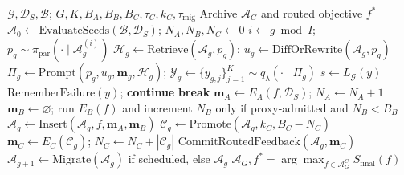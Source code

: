 \begin{algorithm}[t]
\caption{CoEvoP\&R objective evolution}
\label{alg:objective-evolution}
\scriptsize
\begin{algorithmic}[1]
\REQUIRE $\mathcal{G},\mathcal{D}_S,\mathcal{B}$;
$G,K,B_A,B_B,B_C,\tau_C,k_C,\tau_{\mathrm{mig}}$
\ENSURE Archive $\mathcal{A}_G$ and routed objective $f^*$
\STATE $\mathcal{A}_0\leftarrow\mathrm{EvaluateSeeds}(\mathcal{B},\mathcal{D}_S)$;
$N_A,N_B,N_C\leftarrow0$
  \STATE $i\leftarrow g\bmod I$;
  $p_g\sim\pi_{\mathrm{par}}(\cdot\mid\mathcal{A}_g^{(i)})$
  \STATE $\mathcal{H}_g\leftarrow\mathrm{Retrieve}(\mathcal{A}_g,p_g)$;
  $u_g\leftarrow\mathrm{DiffOrRewrite}(\mathcal{A}_g,p_g)$
  \STATE $\Pi_g\leftarrow\mathrm{Prompt}(p_g,u_g,\mathbf{m}_g,\mathcal{H}_g)$;
  $\mathcal{Y}_g\leftarrow\{y_{g,j}\}_{j=1}^{K}\sim q_\lambda(\cdot\mid\Pi_g)$
    \STATE $s\leftarrow L_{\mathcal{G}}(y)$
      \STATE $\mathrm{RememberFailure}(y)$; \textbf{continue}
    \ENDIF
       \STATE \textbf{break} \ENDIF
      \STATE $\mathbf{m}_A\leftarrow E_A(f,\mathcal{D}_S)$; $N_A\leftarrow N_A+1$
      \STATE $\mathbf{m}_B\leftarrow\varnothing$; run $E_B(f)$ and increment $N_B$
      only if proxy-admitted and $N_B<B_B$
      \STATE $\mathcal{A}_g\leftarrow\mathrm{Insert}(\mathcal{A}_g,f,\mathbf{m}_A,\mathbf{m}_B)$
    \ENDFOR
  \ENDFOR
    \STATE $\mathcal{C}_g\leftarrow\mathrm{Promote}(\mathcal{A}_g,k_C,B_C-N_C)$
    \STATE $\mathbf{m}_C\leftarrow E_C(\mathcal{C}_g)$;
    $N_C\leftarrow N_C+|\mathcal{C}_g|$
    \STATE $\mathrm{CommitRoutedFeedback}(\mathcal{A}_g,\mathbf{m}_C)$
  \ENDIF
  \STATE $\mathcal{A}_{g+1}\leftarrow\mathrm{Migrate}(\mathcal{A}_g)$ if scheduled,
  else $\mathcal{A}_g$
\ENDFOR
\STATE \RETURN $\mathcal{A}_G,
f^*=\arg\max_{f\in\mathcal{A}^{C}_G}S_{\mathrm{final}}(f)$
\end{algorithmic}
\end{algorithm}
